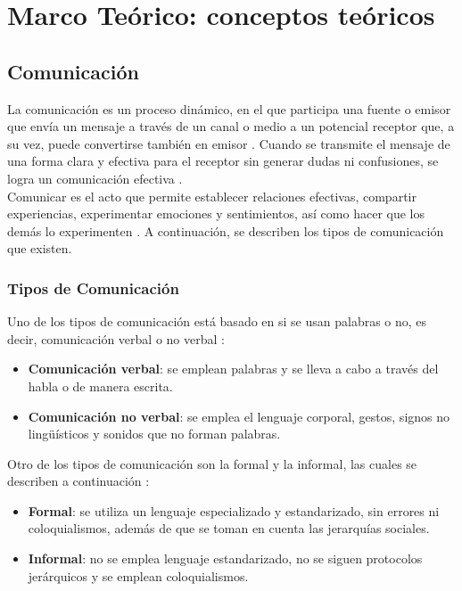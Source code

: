\chapter{Marco Teórico: conceptos teóricos}
\section{Comunicación}
La comunicación es un proceso dinámico, en el que participa una fuente o emisor que envía un mensaje a través de un canal o medio a un potencial receptor que, a su vez, puede convertirse también en emisor \cite{ref20}. Cuando se transmite el mensaje de una forma clara y efectiva para el receptor sin generar dudas ni confusiones, se logra un comunicación efectiva \cite{ref21}.\\

Comunicar es el acto que permite establecer relaciones efectivas, compartir experiencias, experimentar emociones y sentimientos, así como hacer que los demás lo experimenten \cite{ref22}. A continuación, se describen los tipos de comunicación que existen.

\subsection{Tipos de Comunicación}
Uno de los tipos de comunicación está basado en si se usan palabras o no, es decir, comunicación verbal o no verbal \cite{ref23}:

\begin{itemize}
    \item \textbf{Comunicación verbal}: se emplean palabras y se lleva a cabo a través del habla o de manera escrita.
    \item \textbf{Comunicación no verbal}: se emplea el lenguaje corporal, gestos, signos no lingüísticos y sonidos que no forman palabras.
\end{itemize}

Otro de los tipos de comunicación son la formal y la informal, las cuales se describen a continuación \cite{ref23}:

\begin{itemize}
    \item \textbf{Formal}: se utiliza un lenguaje especializado y estandarizado, sin errores ni coloquialismos, además de que se toman en cuenta las jerarquías sociales.
    \item \textbf{Informal}: no se emplea lenguaje estandarizado, no se siguen protocolos jerárquicos y se emplean coloquialismos.
\end{itemize}

